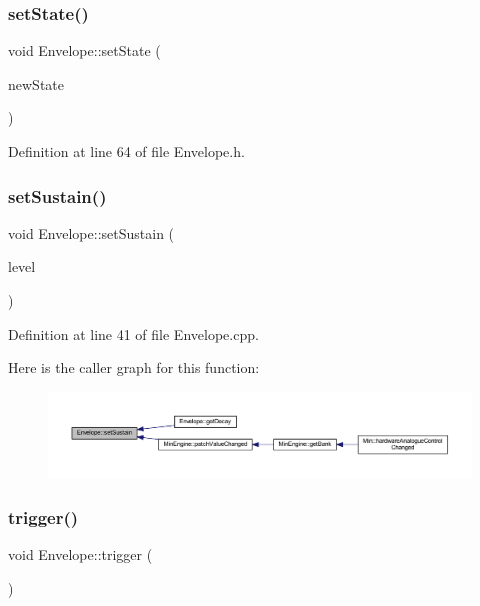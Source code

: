 \subsubsection{\texorpdfstring{set\+State()}{setState()}}
{\footnotesize\ttfamily void Envelope\+::set\+State (\begin{DoxyParamCaption}\item[{\hyperlink{class_envelope_a16c15d3d555a1a27869f48696f430d5f}{Env\+State}}]{new\+State }\end{DoxyParamCaption})\hspace{0.3cm}{\ttfamily [inline]}}



Definition at line 64 of file Envelope.\+h.

\mbox{\label{class_envelope_a18deee1d88842bfbbcfb2765eb944f4d}} 
\subsubsection{\texorpdfstring{set\+Sustain()}{setSustain()}}
{\footnotesize\ttfamily void Envelope\+::set\+Sustain (\begin{DoxyParamCaption}\item[{int}]{level }\end{DoxyParamCaption})}



Definition at line 41 of file Envelope.\+cpp.

Here is the caller graph for this function\+:
\nopagebreak
\begin{figure}[H]
\begin{center}
\leavevmode
\includegraphics[width=350pt]{class_envelope_a18deee1d88842bfbbcfb2765eb944f4d_icgraph}
\end{center}
\end{figure}
\mbox{\label{class_envelope_a03b0aeb7f8550ec701e3a07839ad47ec}} 
\subsubsection{\texorpdfstring{trigger()}{trigger()}}
{\footnotesize\ttfamily void Envelope\+::trigger (\begin{DoxyParamCaption}{ }\end{DoxyParamCaption})}



